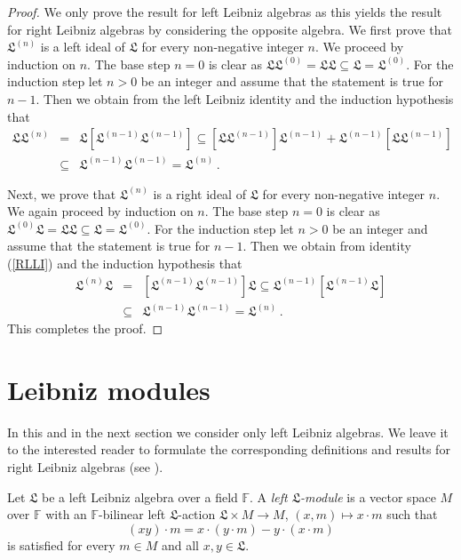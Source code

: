 \documentclass{amsart}
\numberwithin{equation}{section}
\newcommand{\F}{\mathbb{F}}
\newcommand{\lf}{\mathfrak{L}}
\begin{document}
\begin{proof}
We only prove the result for left Leibniz algebras as this yields the result for right Leibniz
algebras by considering the opposite algebra. We first prove that $\lf^{(n)}$ is a left ideal
of $\lf$ for every non-negative integer $n$. We proceed by induction on $n$. The base
step $n=0$ is clear as $\lf\lf^{(0)}=\lf\lf\subseteq\lf=\lf^{(0)}$. For the induction step let
$n>0$ be an integer and assume that the statement is true for $n-1$. Then we obtain from
the left Leibniz identity and the induction hypothesis that
\begin{eqnarray*}
\lf\lf^{(n)} & = & \lf[\lf^{(n-1)}\lf^{(n-1)}]\subseteq[\lf\lf^{(n-1)}]\lf^{(n-1)}+\lf^{(n-1)}
[\lf\lf^{(n-1)}]\\
& \subseteq & \lf^{(n-1)}\lf^{(n-1)}=\lf^{(n)}\,.
\end{eqnarray*}

Next, we prove that $\lf^{(n)}$ is a right ideal of $\lf$ for every non-negative integer $n$.
We again proceed by induction on $n$. The base step $n=0$ is clear as $\lf^{(0)}\lf=\lf\lf
\subseteq\lf=\lf^{(0)}$. For the induction step let $n>0$ be an integer and assume that
the statement is true for $n-1$. Then we obtain from identity (\ref{RLLI}) and the induction
hypothesis that
\begin{eqnarray*}
\lf^{(n)}\lf & = & [\lf^{(n-1)}\lf^{(n-1)}]\lf\subseteq\lf^{(n-1)}[\lf^{(n-1)}\lf]\\
& \subseteq & \lf^{(n-1)}\lf^{(n-1)}=\lf^{(n)}\,.
\end{eqnarray*}
This completes the proof.
\end{proof}


\section{Leibniz modules}


In this and in the next section we consider only left Leibniz algebras. We leave it to the interested
reader to formulate the corresponding definitions and results for right Leibniz algebras (see
\cite{L,LP1}).

Let $\lf$ be a left Leibniz algebra over a field $\F$. A {\em left $\lf$-module\/} is a vector space
$M$ over $\F$ with an $\F$-bilinear left $\lf$-action $\lf\times M\to M$, $(x,m)\mapsto x\cdot m$
such that $$(xy)\cdot m=x\cdot(y\cdot m)-y\cdot(x\cdot m)$$ is satisfied for every $m\in M$
and all $x,y\in\lf$.
\end{document}
